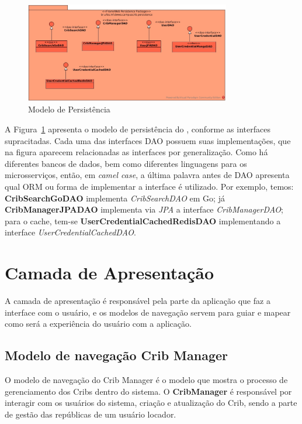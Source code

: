 \begin{figure}[h]
	\centering
	\includegraphics[width=0.8\textwidth]{figuras/modelo-de-persistencia.jpg}
	\caption{Modelo de Persistência}
	\label{figura-arquitetura-persistencia}
\end{figure}

A Figura~\ref{figura-arquitetura-persistencia} apresenta o modelo de persistência do \emph{\imprimirtitulo}, conforme as interfaces supracitadas. Cada uma das interfaces DAO possuem suas implementações, que na figura aparecem relacionadas as interfaces por generalização. Como há diferentes bancos de dados, bem como diferentes linguagens para os microsserviços, então, em \textit{camel case}, a última palavra antes de DAO apresenta qual ORM ou forma de implementar a interface é utilizado. Por exemplo, temos: \textbf{CribSearchGoDAO} implementa \textit{CribSearchDAO} em Go; já \textbf{CribManagerJPADAO} implementa via \textit{JPA} a interface \textit{CribManagerDAO}; para o cache, tem-se \textbf{UserCredentialCachedRedisDAO} implementando a interface \textit{UserCredentialCachedDAO}.


\section{Camada de Apresentação}
\label{sec-frameweb-apresentacao}

A camada de apresentação \cite{phdthesis} é responsável pela parte da aplicação que faz a interface com o usuário, e os modelos de navegação servem para guiar e mapear como será a experiência do usuário com a aplicação.


\subsection{Modelo de navegação Crib Manager}

O modelo de navegação do Crib Manager é o modelo que mostra o processo de gerenciamento dos Cribs dentro do sistema.  
O \textbf{CribManager} é responsável por interagir com os usuários do sistema, criação e atualização do Crib, sendo a parte de gestão das repúblicas de um usuário locador.  

